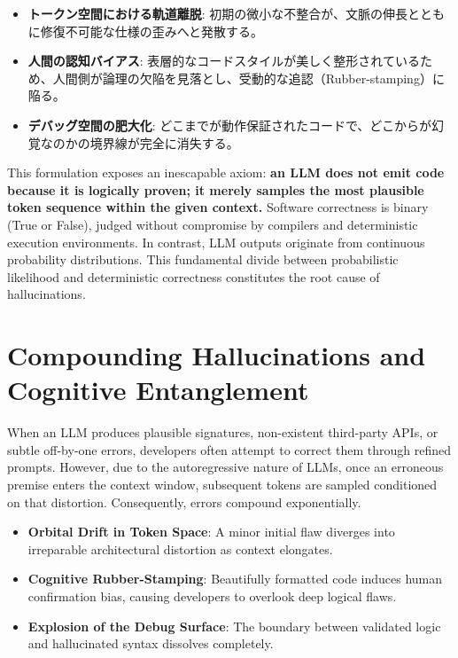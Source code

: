 \documentclass[11pt,a4paper,openany]{book}
\newif\ifja
\begin{document}
  \begin{itemize}
    \item \textbf{トークン空間における軌道離脱}: 初期の微小な不整合が、文脈の伸長とともに修復不可能な仕様の歪みへと発散する。
    \item \textbf{人間の認知バイアス}: 表層的なコードスタイルが美しく整形されているため、人間側が論理の欠陥を見落とし、受動的な追認（Rubber-stamping）に陥る。
    \item \textbf{デバッグ空間の肥大化}: どこまでが動作保証されたコードで、どこからが幻覚なのかの境界線が完全に消失する。
  \end{itemize}
\else
  This formulation exposes an inescapable axiom: \textbf{an LLM does not emit code because it is logically proven; it merely samples the most plausible token sequence within the given context.}
  Software correctness is binary (True or False), judged without compromise by compilers and deterministic execution environments. In contrast, LLM outputs originate from continuous probability distributions. This fundamental divide between probabilistic likelihood and deterministic correctness constitutes the root cause of hallucinations.

  \section{Compounding Hallucinations and Cognitive Entanglement}
  When an LLM produces plausible signatures, non-existent third-party APIs, or subtle off-by-one errors, developers often attempt to correct them through refined prompts.
  However, due to the autoregressive nature of LLMs, once an erroneous premise enters the context window, subsequent tokens are sampled conditioned on that distortion. Consequently, errors compound exponentially.

  \begin{itemize}
    \item \textbf{Orbital Drift in Token Space}: A minor initial flaw diverges into irreparable architectural distortion as context elongates.
    \item \textbf{Cognitive Rubber-Stamping}: Beautifully formatted code induces human confirmation bias, causing developers to overlook deep logical flaws.
    \item \textbf{Explosion of the Debug Surface}: The boundary between validated logic and hallucinated syntax dissolves completely.
  \end{itemize}
\fi

\ifja
\end{document}
